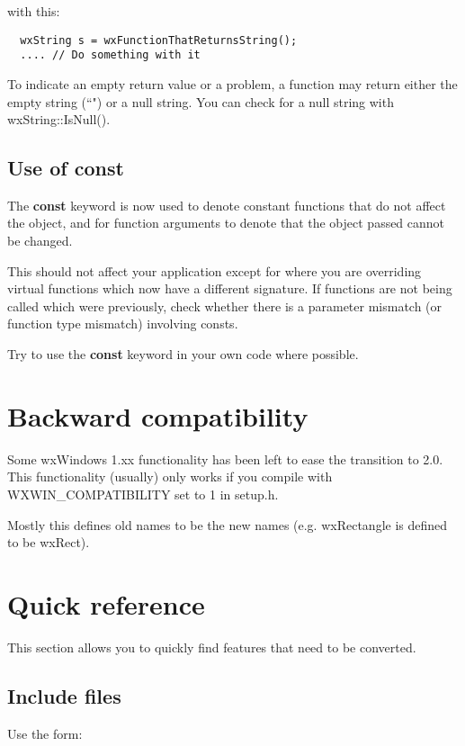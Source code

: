 with this:

{\small\begin{verbatim}
  wxString s = wxFunctionThatReturnsString();
  .... // Do something with it
\end{verbatim}
}

To indicate an empty return value or a problem, a function may return either the
empty string (``") or a null string. You can check for a null string with wxString::IsNull().

\subsection{Use of const}

The {\bf const} keyword is now used to denote constant functions that do not affect the
object, and for function arguments to denote that the object passed cannot be changed.

This should not affect your application except for where you are overriding virtual functions
which now have a different signature. If functions are not being called which were previously,
check whether there is a parameter mismatch (or function type mismatch) involving consts.

Try to use the {\bf const} keyword in your own code where possible.

\section{Backward compatibility}\label{portingcompat}

Some wxWindows 1.xx functionality has been left to ease the transition to 2.0. This functionality
(usually) only works if you compile with WXWIN\_COMPATIBILITY set to 1 in setup.h.

Mostly this defines old names to be the new names (e.g. wxRectangle is defined to be wxRect).

\section{Quick reference}\label{portingquickreference}

This section allows you to quickly find features that
need to be converted.

\subsection{Include files}

Use the form:

